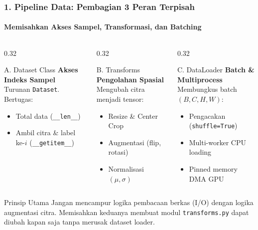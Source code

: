 \documentclass[t,aspectratio=169,xcolor=dvipsnames]{beamer}
\begin{document}
\begin{frame}
  \frametitle{1. Pipeline Data: Pembagian 3 Peran Terpisah}
  \framesubtitle{Memisahkan Akses Sampel, Transformasi, dan Batching}

  \begin{columns}[t]
    \begin{column}{0.32\textwidth}
      \begin{block}{A. Dataset Class}
        \textbf{Akses Indeks Sampel}\\[0.1cm]
        \scriptsize
        Turunan \texttt{Dataset}. Bertugas:
        \begin{itemize}
          \item Total data (\texttt{\_\_len\_\_})
          \item Ambil citra \& label ke-$i$ (\texttt{\_\_getitem\_\_})
        \end{itemize}
      \end{block}
    \end{column}

    \begin{column}{0.32\textwidth}
      \begin{block}{B. Transforms}
        \textbf{Pengolahan Spasial}\\[0.1cm]
        \scriptsize
        Mengubah citra menjadi tensor:
        \begin{itemize}
          \item Resize \& Center Crop
          \item Augmentasi (flip, rotasi)
          \item Normalisasi $(\mu, \sigma)$
        \end{itemize}
      \end{block}
    \end{column}

    \begin{column}{0.32\textwidth}
      \begin{block}{C. DataLoader}
        \textbf{Batch \& Multiprocess}\\[0.1cm]
        \scriptsize
        Membungkus batch $(B, C, H, W)$:
        \begin{itemize}
          \item Pengacakan (\texttt{shuffle=True})
          \item Multi-worker CPU loading
          \item Pinned memory DMA GPU
        \end{itemize}
      \end{block}
    \end{column}
  \end{columns}

  \vspace{0.3cm}
  \begin{exampleblock}{Prinsip Utama}
    Jangan mencampur logika pembacaan berkas (I/O) dengan logika augmentasi citra. Memisahkan keduanya membuat modul \texttt{transforms.py} dapat diubah kapan saja tanpa merusak dataset loader.
  \end{exampleblock}
\end{frame}
\end{document}
